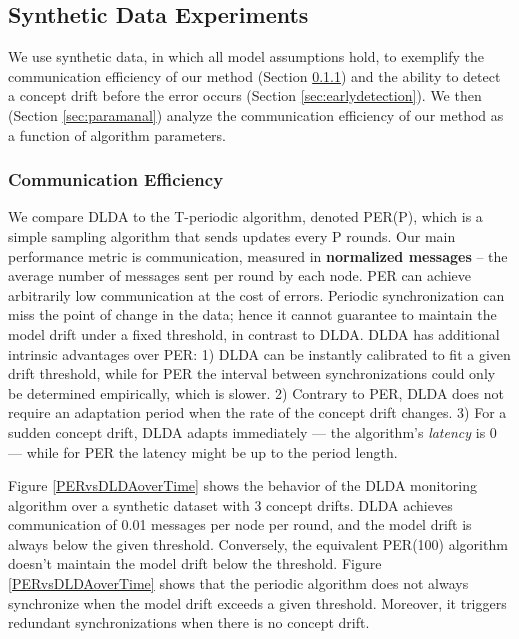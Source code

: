 \subsection{Synthetic Data Experiments}
We use synthetic data, in which all model assumptions hold, to
exemplify the communication efficiency of our method (Section \ref{sec:com_eff}) and the ability to detect a concept drift before the error occurs (Section \ref{sec:earlydetection}). We then (Section \ref{sec:paramanal}) analyze the communication efficiency of our method as a function of algorithm parameters.

\subsubsection{Communication Efficiency}\label{sec:com_eff}
We compare DLDA to the T-periodic algorithm, denoted
PER(P), which is a simple sampling algorithm that sends updates
every P rounds.
Our main performance metric is communication, measured
in \textbf{normalized messages} -- the average number of messages sent per
round by each node. PER can achieve arbitrarily low communication at the cost of errors. Periodic synchronization can miss the point of change in the data; hence it cannot guarantee to maintain the model drift under a fixed threshold, in contrast to DLDA.  DLDA has additional intrinsic advantages over PER: 1) DLDA can be instantly calibrated to fit a given drift threshold, while for PER the interval between synchronizations could only be determined empirically, which is slower. 2) Contrary to PER, DLDA does not require an adaptation period when the rate of the concept drift changes. 3) For a sudden concept drift, DLDA adapts immediately --- the algorithm's \textit{latency} is 0 --- while for PER the latency might be up to the period length.
	
Figure \ref{PERvsDLDAoverTime} shows the behavior of the DLDA monitoring
algorithm over a synthetic dataset with 3 concept drifts.
DLDA achieves communication of 0.01 messages per node per round, and
the model drift is always below the given threshold.
Conversely, the equivalent PER(100) algorithm doesn't maintain the
model drift below the threshold.
Figure \ref{PERvsDLDAoverTime} shows that the periodic algorithm does not always  synchronize when the model drift exceeds a given threshold. Moreover, it  triggers redundant synchronizations when there is no concept drift.

